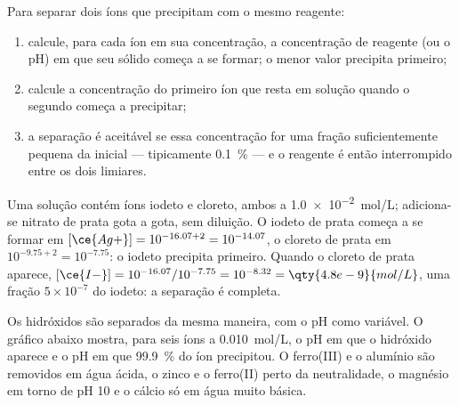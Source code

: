 \begin{method}\label{met:b1:precipitation:selective}
Para separar dois íons que precipitam com o mesmo reagente:
\begin{enumerate}
  \item calcule, para cada íon em sua concentração, a concentração de
        reagente (ou o pH) em que seu sólido começa a se formar; o menor
        valor precipita primeiro;
  \item calcule a concentração do primeiro íon que resta em solução
        quando o segundo começa a precipitar;
  \item a separação é aceitável se essa concentração for uma fração
        suficientemente pequena da inicial --- tipicamente \qty{0.1}{\percent}
        --- e o reagente é então interrompido entre os dois limiares.
\end{enumerate}
\end{method}

\begin{example}\label{ex:b1:precipitation:i-cl}
Uma solução contém íons iodeto e cloreto, ambos a
\qty{1.0e-2}{mol/L}; adiciona-se nitrato de prata gota a gota, sem
diluição. O iodeto de prata começa a se formar em $[\ce{Ag+}] = 10^{-16.07 + 2} =
10^{-14.07}$, o cloreto de prata em $10^{-9.75 + 2} = 10^{-7.75}$: o
iodeto precipita primeiro. Quando o cloreto de prata aparece,
$[\ce{I-}] = 10^{-16.07}/10^{-7.75} = 10^{-8.32} = \qty{4.8e-9}{mol/L}$,
uma fração $5 \times 10^{-7}$ do iodeto: a separação é completa.
\end{example}

Os hidróxidos são separados da mesma maneira, com o pH como variável. O
gráfico abaixo mostra, para seis íons a \qty{0.010}{mol/L}, o pH em que
o hidróxido aparece e o pH em que \qty{99.9}{\percent} do íon
precipitou. O ferro(III) e o alumínio são removidos em água ácida, o
zinco e o ferro(II) perto da neutralidade, o magnésio em torno de pH 10
e o cálcio só em água muito básica.


